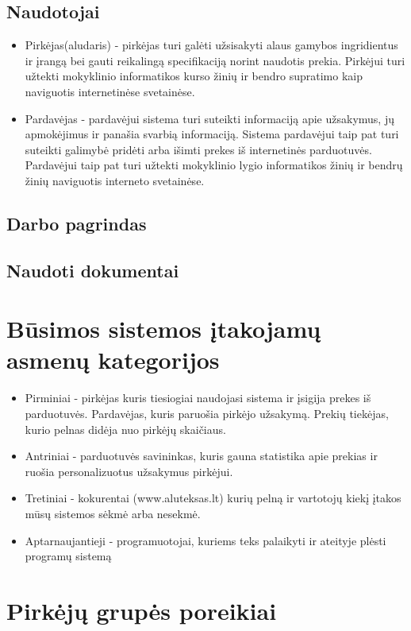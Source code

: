 \documentclass[oneside]{VUMIFPSkursinis}
\begin{document}
	\subsection{Naudotojai}
		\begin{itemize}
			\item{Pirkėjas(aludaris) - pirkėjas turi galėti užsisakyti alaus gamybos ingridientus ir įrangą bei gauti reikalingą specifikaciją norint naudotis prekia.
				Pirkėjui turi užtekti mokyklinio informatikos kurso žinių ir bendro supratimo kaip naviguotis internetinėse svetainėse.}
			\item{Pardavėjas - pardavėjui sistema turi suteikti informaciją apie užsakymus, jų apmokėjimus ir panašia svarbią informaciją.
				Sistema pardavėjui taip pat turi suteikti galimybė pridėti arba išimti prekes iš internetinės parduotuvės.
				Pardavėjui taip pat turi užtekti mokyklinio lygio informatikos žinių ir bendrų žinių naviguotis interneto svetainėse.}
		\end{itemize}
	\subsection{Darbo pagrindas}
	\subsection{Naudoti dokumentai}

\section{Būsimos sistemos įtakojamų asmenų kategorijos}
\begin{itemize}
			\item{Pirminiai - pirkėjas kuris tiesiogiai naudojasi sistema ir įsigija prekes iš parduotuvės. 
				Pardavėjas, kuris paruošia pirkėjo užsakymą. 
				Prekių tiekėjas, kurio pelnas didėja nuo pirkėjų skaičiaus.}
			\item{Antriniai - parduotuvės savininkas, kuris gauna statistika apie prekias ir ruošia personalizuotus užsakymus pirkėjui.}
			\item{Tretiniai - kokurentai (www.aluteksas.lt) kurių pelną ir vartotojų kiekį įtakos mūsų sistemos sėkmė arba nesekmė. }
			\item{Aptarnaujantieji - programuotojai, kuriems teks palaikyti ir ateityje plėsti programų sistemą}
		\end{itemize}

\section{Pirkėjų grupės poreikiai}
\end{document}
